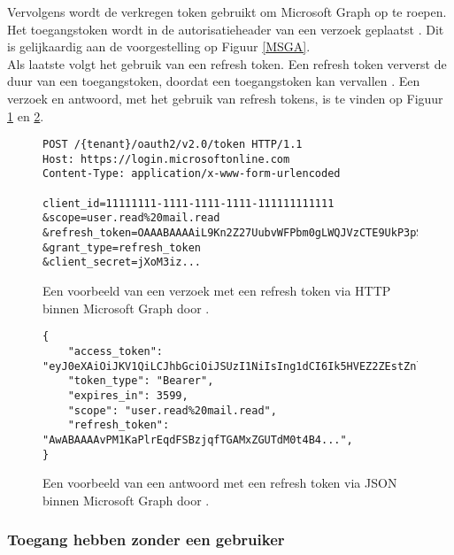 Vervolgens wordt de verkregen token gebruikt om Microsoft Graph op te roepen. Het toegangstoken wordt in de autorisatieheader van een verzoek geplaatst \autocite{Microsoft2023r}. Dit is gelijkaardig aan de voorgestelling op Figuur \ref{MSGA}. \\

Als laatste volgt het gebruik van een refresh token. Een refresh token ververst de duur van een toegangstoken, doordat een toegangstoken kan vervallen \autocite{Microsoft2023r}. Een verzoek en antwoord, met het gebruik van refresh tokens, is te vinden op Figuur \ref{MSGRTR} en \ref{MSGRTRES}.

\begin{figure}[h!]
    \scriptsize
    \begin{verbatim}
POST /{tenant}/oauth2/v2.0/token HTTP/1.1
Host: https://login.microsoftonline.com
Content-Type: application/x-www-form-urlencoded

client_id=11111111-1111-1111-1111-111111111111
&scope=user.read%20mail.read
&refresh_token=OAAABAAAAiL9Kn2Z27UubvWFPbm0gLWQJVzCTE9UkP3pSx1aXxUjq...
&grant_type=refresh_token
&client_secret=jXoM3iz...   
    \end{verbatim}  
    \caption[Voorbeeld Refresh token Request Microsoft Graph]{Een voorbeeld van een verzoek met een refresh token via \ac{HTTP} binnen Microsoft Graph door \textcite{Microsoft2023r}.}
    \label{MSGRTR}
\end{figure}

\begin{figure}[h!]
    \scriptsize
    \begin{verbatim}
{
    "access_token": "eyJ0eXAiOiJKV1QiLCJhbGciOiJSUzI1NiIsIng1dCI6Ik5HVEZ2ZEstZnl0aEV1Q...",
    "token_type": "Bearer",
    "expires_in": 3599,
    "scope": "user.read%20mail.read",
    "refresh_token": "AwABAAAAvPM1KaPlrEqdFSBzjqfTGAMxZGUTdM0t4B4...",
}    
    \end{verbatim}    
    \caption[Voorbeeld Refresh token Response Microsoft Graph]{Een voorbeeld van een antwoord met een refresh token via \ac{JSON} binnen Microsoft Graph door \textcite{Microsoft2023r}.}
    \label{MSGRTRES}
\end{figure}



\subsubsection{Toegang hebben zonder een gebruiker}


